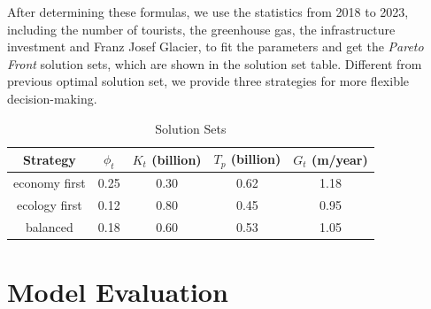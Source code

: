 \documentclass{mcmthesis}
\begin{document}
After determining these formulas, we use the statistics from 2018 to 2023, including the number of tourists, the greenhouse gas, 
the infrastructure investment and Franz Josef Glacier, to fit the parameters and get the \emph{Pareto Front} solution sets, which
are shown in the solution set table. Different from previous optimal solution set, we provide three strategies for more flexible 
decision-making.

\begin{table}[H]
  \caption{Solution Sets}    
  \centering
  \begin{tabular}{ccccc}
    \toprule
    Strategy & $\phi_t$ & $K_t$ (billion) & $T_p$ (billion) & $G_t$ (m/year) \\
    \midrule
    economy first & 0.25 & 0.30 & 0.62 & 1.18 \\
    ecology first & 0.12 & 0.80 & 0.45 & 0.95 \\
    balanced & 0.18 & 0.60 & 0.53 & 1.05 \\
    \bottomrule
  \end{tabular}
\end{table}

\section{Model Evaluation}
\end{document}
